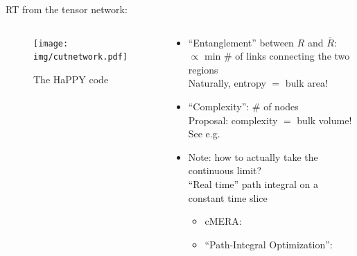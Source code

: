 \documentclass[aspectratio=169,10pt
	,noamsthm
]{beamer}
\begin{document}
\begin{frame}{RT from the tensor network}{\textcite{Harlow:2018fse}:\,}
	\begin{columns}
	\begin{column}{.35\textwidth}
		\begin{figure}[!h]
		\centering
		\texttt{[image: img/cutnetwork.pdf]}
		\caption{The HaPPY code \cite{Pastawski:2015qua,Harlow:2018fse}}
		\end{figure}
	\end{column}
	\begin{column}{.65\textwidth}
		\begin{itemize}
		\item ``Entanglement'' between $R$ and $\bar{R}$:\\
		$\propto$ min \# of links connecting the two regions\\
		Naturally, entropy $=$ bulk area!
	\pause
		\item ``Complexity'': \# of nodes\\
		Proposal: complexity $=$ bulk volume!\\
		{\footnotesize See e.g.~\textcite{Susskind:2014rva}}
	\pause
		\item Note: how to actually take the continuous limit?\\
		``Real time'' path integral on a constant time slice
			\begin{itemize}
			\item cMERA: \textcite{Nozaki:2012zj}
			\item ``Path-Integral Optimization'':\\
			\textcite{Boruch:2021hqs}
			\end{itemize}
		\end{itemize}
	\end{column}
	\end{columns}
\end{frame}
\end{document}
